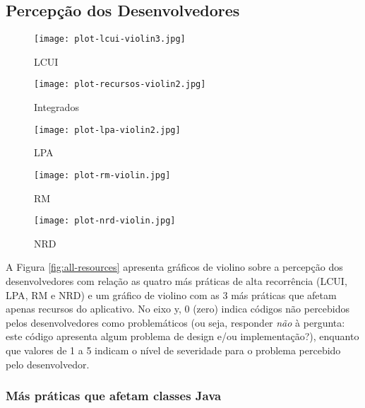 \subsection{Percepção dos Desenvolvedores}

\begin{figure*}
\centering
\begin{subfigure}{.22\textwidth}
  \centering
  \texttt{[image: plot-lcui-violin3.jpg]}
  \caption{\textsc{LCUI}}
  \label{fig:lcui}
\end{subfigure}%
\begin{subfigure}{.17\textwidth}
  \centering
  \texttt{[image: plot-recursos-violin2.jpg]}
  \caption{Integrados}
  \label{fig:resources}
\end{subfigure}%
\begin{subfigure}{.17\textwidth}
  \centering
  \texttt{[image: plot-lpa-violin2.jpg]}
  \caption{\textsc{LPA}}
  \label{fig:lpa}
\end{subfigure}%
\begin{subfigure}{.17\textwidth}
  \centering
  \texttt{[image: plot-rm-violin.jpg]}
  \caption{\textsc{RM}}
  \label{fig:rm}
\end{subfigure}
\begin{subfigure}{.17\textwidth}
  \centering
  \texttt{[image: plot-nrd-violin.jpg]}
  \caption{\textsc{NRD}}
  \label{fig:nrd}
\end{subfigure}%
\caption{Gráficos violino individuais das más práticas que afetam recursos (\textsc{LPA}, \textsc{RM} e \textsc{NRD}).}
\label{fig:all-resources}
\vspace{-.5cm} 
\end{figure*}


A Figura \ref{fig:all-resources} apresenta gráficos de violino sobre a percepção dos desenvolvedores com relação as quatro más práticas de alta recorrência (\textsc{LCUI}, \textsc{LPA}, \textsc{RM} e \textsc{NRD}) e um gráfico de violino com as 3 más práticas que afetam apenas recursos do aplicativo. No eixo y, 0 (zero) indica códigos não percebidos pelos desenvolvedores como problemáticos (ou seja, responder \emph{não} à pergunta: este código apresenta algum problema de design e/ou implementação?), enquanto que valores de 1 a 5 indicam o nível de severidade para o problema percebido pelo desenvolvedor.

\subsubsection{Más práticas que afetam classes Java}

